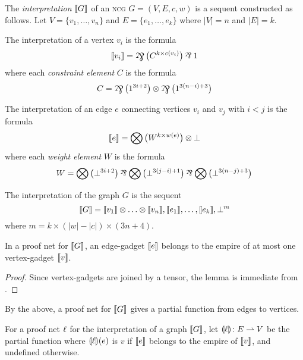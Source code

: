 \begin{definition}
The \emph{interpretation} $\llbracket G\rrbracket$ of an \textsc{ncg} $G=(V,E,c,w)$ is a sequent constructed as follows.
%
Let $V=\{v_1,\dotsc,v_n\}$ and $E=\{e_1,\dotsc,e_k\}$ where $|V|=n$ and $|E|=k$.

The interpretation of a vertex $v_i$ is the formula
\[
	\itn{v_i} = \bigparr\big(C^{k\times c(v_i)} \big)\parr 1
\]
where each \emph{constraint element} $C$ is the formula
\[
	C = \bigparr\big(1^{3i+2}\big) \tn \bigparr\big(1^{3(n-i)+3}\big)
\]

The interpretation of an edge $e$ connecting vertices $v_i$ and $v_j$ with $i<j$ is the formula
\[
	\llbracket e\rrbracket = \bigotimes\big(W^{k\times w(e)}\big)\otimes\bot
\]
where each \emph{weight element} $W$ is the formula
\[
	W = \bigotimes\big(\bot^{3i+2}\big)\parr\bigotimes\big(\bot^{3(j-i)+1}\big)\parr\bigotimes\big(\bot^{3(n-j)+3}\big)
\]

The interpretation of the graph $G$ is the sequent
\[
	\llbracket G\rrbracket = \llbracket v_1\rrbracket\otimes\dotso\otimes\llbracket v_n\rrbracket, \llbracket e_1\rrbracket,\dotsc,\llbracket e_k\rrbracket, \bot^m
\]
where $m=k\times(|w|-|c|)\times(3n+4)$.

\end{definition}



\begin{lemma}
In a proof net for $\llbracket G\rrbracket$, an edge-gadget $\llbracket e\rrbracket$ belongs to the empire of at most one vertex-gadget $\llbracket v\rrbracket$.
\end{lemma}

\begin{proof}
Since vertex-gadgets are joined by a tensor, the lemma is immediate from \cite[Proposition 1]{Bellin-vandeWiele-1995}.
\end{proof}






By the above, a proof net for $\llbracket G\rrbracket$ gives a partial function from edges to vertices.

\begin{definition}
	For a proof net $\ell$ for the interpretation of a graph $\llbracket G\rrbracket$, let $\llparenthesis\ell\rrparenthesis\colon E\rightharpoonup V$ be the partial function where $\llparenthesis\ell\rrparenthesis(e)$ is $v$ if $\llbracket e\rrbracket$ belongs to the empire of $\llbracket v\rrbracket$, and undefined otherwise.
\end{definition}

